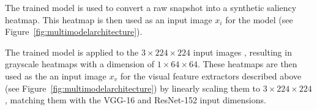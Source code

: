 The trained model is used to convert a raw snapshot into a synthetic saliency heatmap. This heatmap is then used as an input image $x_i$ for the \modelname{} model (see Figure~\ref{fig:multimodelarchitecture}).

The trained model is applied to the $3\times224\times224$ input images , resulting in grayscale heatmaps with a dimension of $1\times64\times64$.
These heatmaps are then used as the an input image $x_{v}$ for the visual feature extractors described above (see Figure~\ref{fig:multimodelarchitecture}) by linearly scaling them to $3\times224\times224$, matching them with the VGG-16 and ResNet-152 input dimensions.
\fi